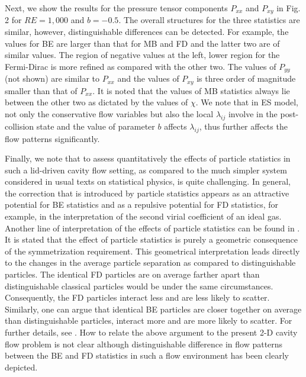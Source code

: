 \documentclass[aip,jmp,amsmath,amssymb,reprint,noshowpacs]{revtex4-1}
\begin{document}
Next, we show the results for the pressure tensor components $P_{xx}$ and $P_{xy}$ in Fig. 2 for $RE=1,000$ and $b=-0.5$.  The overall structures for the three statistics are similar, however, distinguishable differences can be detected.  For example, the values for BE are larger than that for MB and FD and the latter two are of similar values.  The region of negative values at the left, lower region for the Fermi-Dirac is more refined as compared with the other two.  The values of $P_{yy}$ (not shown) are similar to $P_{xx}$ and the values of $P_{xy}$ is three order of magnitude smaller than that of $P_{xx}$.  It is noted that the values of MB statistics always lie between the other two as dictated by the values of $\chi$.  We note that in ES model, not only the conservative flow variables but also the local $\lambda_{ij}$ involve in the post-collision state and the value of parameter $b$ affects $\lambda_{ij}$, thus further affects the flow patterns significantly.

Finally, we note that to assess quantitatively the effects of particle statistics in such a lid-driven cavity flow setting, as compared to the much simpler system considered in usual texts on statistical physics, is quite challenging. In general, the correction that is introduced by particle statistics appears as an attractive potential for BE statistics and as a repulsive potential for FD statistics, for example, in the interpretation of the second virial coefficient of an ideal gas. Another line of interpretation of the effects of particle statistics can be found in \cite{Mullin2003}.
It is stated that the effect of particle statistics is purely a geometric consequence of the symmetrization requirement. This geometrical interpretation leads directly to the changes in the average particle separation as compared to distinguishable particles. The identical FD particles are on average farther apart than distinguishable classical particles would be under the same circumstances. Consequently, the FD particles interact less and are less likely to scatter. Similarly, one can argue that identical BE particles are closer together on average than distinguishable particles, interact more and are more likely to scatter. For further details, see \cite{Mullin2003}. How to relate the above argument to the present 2-D cavity flow problem is not clear although distinguishable difference in flow patterns between the BE and FD statistics in such a flow environment has been clearly depicted.
\end{document}
